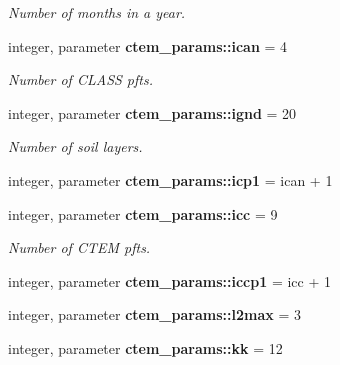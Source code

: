 \begin{DoxyCompactItemize}
\begin{DoxyCompactList}\small\item\em Number of months in a year. \end{DoxyCompactList}\item 
\hypertarget{namespacectem__params_af834d482b4eec80d530f6f6afc9fc5b5}{}integer, parameter {\bfseries ctem\+\_\+params\+::ican} = 4\label{namespacectem__params_af834d482b4eec80d530f6f6afc9fc5b5}

\begin{DoxyCompactList}\small\item\em Number of C\+L\+A\+S\+S pfts. \end{DoxyCompactList}\item 
\hypertarget{namespacectem__params_aa84174d70bc4dcedb2b6edeb859f1507}{}integer, parameter {\bfseries ctem\+\_\+params\+::ignd} = 20\label{namespacectem__params_aa84174d70bc4dcedb2b6edeb859f1507}

\begin{DoxyCompactList}\small\item\em Number of soil layers. \end{DoxyCompactList}\item 
\hypertarget{namespacectem__params_a8b61932a368c557cc3cb7edf6de23e22}{}integer, parameter {\bfseries ctem\+\_\+params\+::icp1} = ican + 1\label{namespacectem__params_a8b61932a368c557cc3cb7edf6de23e22}

\item 
\hypertarget{namespacectem__params_afa448c586accb0aa6dade1df419eb2fd}{}integer, parameter {\bfseries ctem\+\_\+params\+::icc} = 9\label{namespacectem__params_afa448c586accb0aa6dade1df419eb2fd}

\begin{DoxyCompactList}\small\item\em Number of C\+T\+E\+M pfts. \end{DoxyCompactList}\item 
\hypertarget{namespacectem__params_a1da4b2c80e21cf1adf10e9c7ee9a2189}{}integer, parameter {\bfseries ctem\+\_\+params\+::iccp1} = icc + 1\label{namespacectem__params_a1da4b2c80e21cf1adf10e9c7ee9a2189}

\item 
\hypertarget{namespacectem__params_af57395876febe85e76b0403ab6a4e8ed}{}integer, parameter {\bfseries ctem\+\_\+params\+::l2max} = 3\label{namespacectem__params_af57395876febe85e76b0403ab6a4e8ed}

\item 
\hypertarget{namespacectem__params_a4b2eab1c298364048680641681921e56}{}integer, parameter {\bfseries ctem\+\_\+params\+::kk} = 12\label{namespacectem__params_a4b2eab1c298364048680641681921e56}


\end{DoxyCompactItemize}
